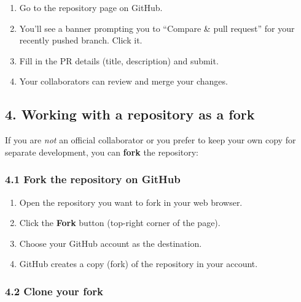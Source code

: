 \documentclass[
  letterpaper,
  DIV=11,
  numbers=noendperiod]{scrartcl}
\providecommand{\tightlist}{%
  \setlength{\itemsep}{0pt}\setlength{\parskip}{0pt}}\usepackage{longtable,booktabs,array}
\begin{document}
\begin{enumerate}
\def\labelenumi{\arabic{enumi}.}
\tightlist
\item
  Go to the repository page on GitHub.\\
\item
  You'll see a banner prompting you to ``Compare \& pull request'' for
  your recently pushed branch. Click it.\\
\item
  Fill in the PR details (title, description) and submit.\\
\item
  Your collaborators can review and merge your changes.
\end{enumerate}

\subsection{4. Working with a repository as a
fork}\label{working-with-a-repository-as-a-fork}

If you are \emph{not} an official collaborator or you prefer to keep
your own copy for separate development, you can \textbf{fork} the
repository:

\subsubsection{4.1 Fork the repository on
GitHub}\label{fork-the-repository-on-github}

\begin{enumerate}
\def\labelenumi{\arabic{enumi}.}
\tightlist
\item
  Open the repository you want to fork in your web browser.\\
\item
  Click the \textbf{Fork} button (top-right corner of the page).\\
\item
  Choose your GitHub account as the destination.\\
\item
  GitHub creates a copy (fork) of the repository in your account.
\end{enumerate}

\subsubsection{4.2 Clone your fork}\label{clone-your-fork}
\end{document}
